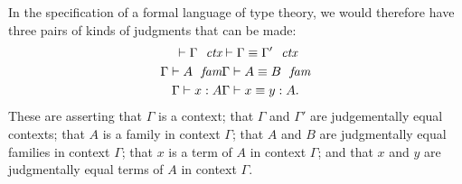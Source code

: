 In the specification of a formal language of type theory, we would therefore
have three pairs of kinds of judgments that can be made:
\begin{align*}
\jalign\jctx{\Gamma} 
& \jalign\jctxeq{\Gamma}{\Gamma'}
  \\
\jalign\jfam{\Gamma}{A} 
& \jalign\jfameq{\Gamma}{A}{B}
  \\
\jalign\jterm{\Gamma}{A}{x} 
& \jalign\jtermeq{\Gamma}{A}{x}{y}.
\end{align*}
These are asserting that $\Gamma$ is a context; that $\Gamma$ and $\Gamma'$ are
judgementally equal contexts; that $A$ is a family in context $\Gamma$; that
$A$ and $B$ are judgmentally equal families in context $\Gamma$; that $x$ is
a term of $A$ in context $\Gamma$; and that $x$ and $y$ are judgmentally equal
terms of $A$ in context $\Gamma$. 
 
